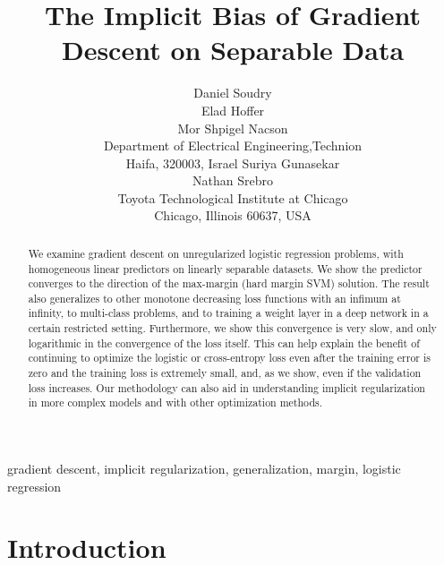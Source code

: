 \documentclass[twoside,11pt,english]{article}
\begin{document}
\title{The Implicit Bias of Gradient Descent on Separable Data}
\author{\name Daniel Soudry \\
\name Elad Hoffer \\
\name Mor Shpigel Nacson  \\
\addr  Department of Electrical Engineering,Technion \\ 
   Haifa, 320003, Israel 
\AND
\name Suriya Gunasekar \\
\name Nathan Srebro \\
\addr  Toyota Technological Institute at Chicago \\ 
   Chicago, Illinois 60637, USA 
}

\maketitle
\begin{abstract}%
We examine gradient descent on unregularized logistic regression problems, with homogeneous linear predictors on linearly separable datasets. We show the predictor converges to the
direction of the max-margin (hard margin SVM) solution. The result also generalizes
to other monotone decreasing loss functions with an infimum at infinity, to multi-class problems, and to training a weight layer in a deep network in a certain restricted setting.  Furthermore, we show this convergence is very slow, and only
logarithmic in the convergence of the loss itself. This can help explain
the benefit of continuing to optimize the logistic or cross-entropy
loss even after the training error is zero and the training loss is
extremely small, and, as we show, even if the validation loss increases.
Our methodology can also aid in understanding implicit regularization
in more complex models and with other optimization methods. 
\end{abstract}

\begin{keywords}
	gradient descent, implicit regularization, generalization, margin, logistic regression
\end{keywords}

\section{Introduction}
\end{document}
